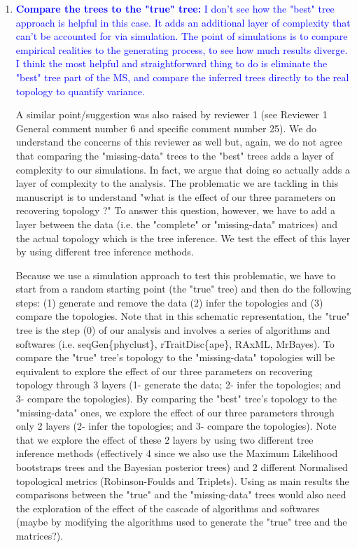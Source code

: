 \documentclass[12pt,letterpaper]{article}
\begin{document}
\begin{enumerate}
\item{\textcolor{blue}{\textbf{Compare the trees to the "true" tree:} I don't see how the "best" tree approach is helpful in this case. It adds an additional layer of complexity that can't be accounted for via simulation. The point of simulations is to compare empirical realities to the generating process, to see how much results diverge. I think the most helpful and straightforward thing to do is eliminate the "best" tree part of the MS, and compare the inferred trees directly to the real topology to quantify variance.}}

A similar point/suggestion was also raised by reviewer 1 (see Reviewer 1 General comment number 6 and specific comment number 25).
We do understand the concerns of this reviewer as well but, again, we do not agree that comparing the "missing-data" trees to the "best" trees adds a layer of complexity to our simulations.
In fact, we argue that doing so actually adds a layer of complexity to the analysis.
The problematic we are tackling in this manuscript is to understand "what is the effect of our three parameters on recovering topology ?"
To answer this question, however, we have to add a layer between the data (i.e. the "complete" or "missing-data" matrices) and the actual topology which is the tree inference.
We test the effect of this layer by using different tree inference methods.

Because we use a simulation approach to test this problematic, we have to start from a random starting point (the "true" tree) and then do the following steps: (1) generate and remove the data (2) infer the topologies and (3) compare the topologies.
Note that in this schematic representation, the "true" tree is the step (0) of our analysis and involves a series of algorithms and softwares (i.e. seqGen\{phyclust\}, rTraitDisc\{ape\}, RAxML, MrBayes).
To compare the "true" tree's topology to the "missing-data" topologies will be equivalent to explore the effect of our three parameters on recovering topology through 3 layers (1- generate the data; 2- infer the topologies; and 3- compare the topologies).
By comparing the "best" tree's topology to the "missing-data" ones, we explore the effect of our three parameters through only 2 layers (2- infer the topologies; and 3- compare the topologies).
Note that we explore the effect of these 2 layers by using two different tree inference methods (effectively 4 since we also use the Maximum Likelihood bootstraps trees and the Bayesian posterior trees) and 2 different Normalised topological metrics (Robinson-Foulds and Triplets).
Using as main results the comparisons between the "true" and the "missing-data" trees would also need the exploration of the effect of the cascade of algorithms and softwares (maybe by modifying the algorithms used to generate the "true" tree and the matrices?).


\end{enumerate}
\end{document}
